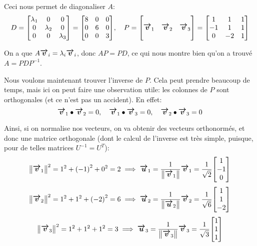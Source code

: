 \documentclass[a4paper]{article}
\begin{document}
{    Ceci nous permet de diagonaliser $A$:
    \[D = \begin{bmatrix} \lambda_1 & 0 & 0 \\ 0 & \lambda_2 & 0 \\ 0 & 0 & \lambda_3 \end{bmatrix} = \begin{bmatrix} 8 & 0 & 0 \\ 0 & 6 & 0 \\ 0 & 0 & 3 \end{bmatrix}, \mathspace P = \begin{bmatrix}  &  &  \\ \bvec{v}_1 & \bvec{v}_2 & \bvec{v}_3 \\  &  &  \end{bmatrix} = \begin{bmatrix} 1 & 1 & 1 \\ -1 & 1 & 1 \\ 0 & -2 & 1 \end{bmatrix} \]

    On a que $A \bm{\protect\overrightarrow{v}}_i = \lambda_i \bm{\protect\overrightarrow{v}}_i$, donc $AP = PD$, ce qui nous montre bien qu'on a trouvé $A = PDP^{-1}$.

    Nous voulons maintenant trouver l'inverse de $P$. Cela peut prendre beaucoup de temps, mais ici on peut faire une observation utile: les colonnes de $P$ sont orthogonales (et ce n'est pas un accident). En effet:
    \[\bm{\protect\overrightarrow{v}}_1 \bullet \bm{\protect\overrightarrow{v}}_2 = 0, \quad \bm{\protect\overrightarrow{v}}_1 \bullet \bm{\protect\overrightarrow{v}}_3 = 0, \quad \bm{\protect\overrightarrow{v}}_2 \bullet \bm{\protect\overrightarrow{v}}_3 = 0\]

    Ainsi, si on normalise nos vecteurs, on va obtenir des vecteurs orthonormés, et donc une matrice orthogonale (dont le calcul de l'inverse est très simple, puisque, pour de telles matrices $U^{-1} = U^T$):
    \[\left\|\bvec{v}_1\right\|^2 = 1^2 + \left(-1\right)^2 + 0^2 = 2 \implies \bvec{u}_1 = \frac{1}{\left\|\bvec{v}_1\right\|} \bvec{v}_1 = \frac{1}{\sqrt{2}} \begin{bmatrix} 1 \\ -1 \\ 0 \end{bmatrix} \]
    \[\left\|\bvec{v}_2\right\|^2 = 1^2 + 1^2 + \left(-2\right)^2 = 6 \implies \bvec{u}_2 = \frac{1}{\left\|\bvec{u}_2\right\|} \bvec{v}_2 = \frac{1}{\sqrt{6}} \begin{bmatrix} 1 \\ 1 \\ -2 \end{bmatrix} \]
    \[\left\|\bvec{v}_3\right\|^2 = 1^2 + 1^2 + 1^2 = 3 \implies \bvec{u}_3 = \frac{1}{\left\|\bvec{v}_3\right\|} \bvec{v}_3 = \frac{1}{\sqrt{3}} \begin{bmatrix} 1 \\ 1 \\ 1 \end{bmatrix} \]

}
\end{document}
